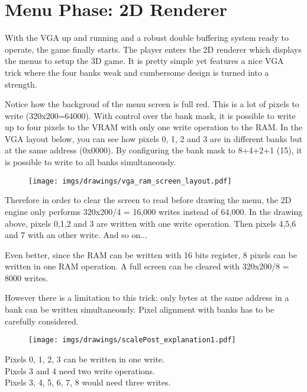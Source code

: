 \section{Menu Phase: 2D Renderer}
With the VGA up and running and a robust double buffering system ready to operate, the game finally starts. The player enters the 2D renderer which displays the menus to setup the 3D game. It is pretty simple yet features a nice VGA trick where the four banks weak and cumbersome design is turned into a strength.
\par
\begin{figure}[H]
\centering
{}
\end{figure}
\par

Notice how the backgroud of the menu screen is full red. This is a lot of pixels to write (320x200=64000). With control over the bank mask, it is possible to write up to four pixels to the VRAM with only one write operation to the RAM. In the VGA layout below, you can see how pixels 0, 1, 2 and 3 are in different banks but at the same address (0x0000). By configuring the bank mask to 8+4+2+1 (15), it is possible to write to all banks simultaneously.\\
\par
\begin{figure}[H]
\centering
\texttt{[image: imgs/drawings/vga\_ram\_screen\_layout.pdf]}
\end{figure}

\par
Therefore in order to clear the screen to read before drawing the menu, the 2D engine only performs 320x200/4 = 16,000 writes instead of 64,000. In the drawing above, pixels 0,1,2 and 3 are written with one write operation. Then pixels 4,5,6 and 7 with an other write. And so on...\\
\par
Even better, since the RAM can be written with 16 bits register, 8 pixels can be written in one RAM operation. A full screen can be cleared with 320x200/8 = 8000 writes.
\par
\begin{minipage}{\textwidth}

\end{minipage}
However there is a limitation to this trick: only bytes at the same address in a bank can be written simultaneously. Pixel alignment with banks has to be carefully considered.\
\par
\begin{figure}[H]
\centering
 \texttt{[image: imgs/drawings/scalePost\_explanation1.pdf]}
 \end{figure}
Pixels 0, 1, 2, 3 can be written in one write.\\
Pixels 3 and 4 need two write operations.\\
Pixels 3, 4, 5, 6, 7, 8 would need three writes.\\


